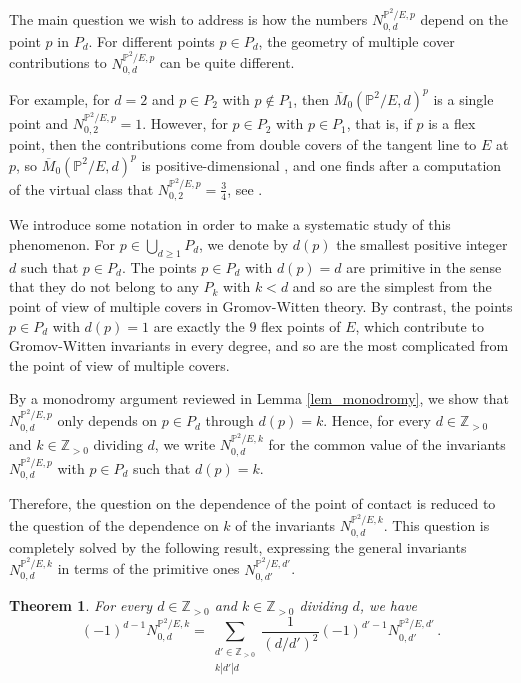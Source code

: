 \documentclass[11pt,letterpaper]{amsart}
\newtheorem{thm}[defn]{Theorem}
\newcommand\PP{\mathbb P}
\newcommand\Z{\mathbb Z}
\begin{document}
The main question we wish to address is how the numbers
$N_{0,d}^{\PP^2/E,p}$ depend on the point $p$ in $P_d$.
For different points $p \in P_d$, the geometry of multiple cover contributions to $N_{0,d}^{\PP^2/E,p}$ can be quite different. 

For example, for $d=2$ and $p \in P_2$ with $p \notin P_1$, then $\overline{M}_{0}(\PP^2/E,d)^p$ is a single point and $N_{0,2}^{\PP^2/E,p}=1$. However, for $p \in P_2$ with $p \in P_1$, that is, if $p$ is a flex point, then
the contributions come from double covers of the tangent line to $E$ at $p$, so 
$\overline{M}_{0}(\PP^2/E,d)^p$ is positive-dimensional , and one finds after a computation of the virtual class that
$N_{0,2}^{\PP^2/E,p}=\frac{3}{4}$,
see \cite[Proposition 6.1]{MR2667135}.

We introduce some notation in order to make a systematic study of this phenomenon.
For $p \in \bigcup_{d \geqslant 1} P_d$, we denote by 
$d(p)$ the smallest positive integer $d$ such that 
$p \in P_d$. 
The points $p \in P_d$ with $d(p)=d$ are 
primitive in the sense that they do not belong to any $P_k$ with $k<d$ and so are the simplest
from the point of view of multiple covers in Gromov-Witten theory. 
By contrast, the points $p \in P_d$ with $d(p)=1$ are exactly the $9$ flex points of $E$, which contribute to Gromov-Witten invariants in every degree, and so are the most complicated from the point of view of multiple covers.


By a monodromy argument reviewed in Lemma
\ref{lem_monodromy}, we show that
$N_{0,d}^{\PP^2/E,p}$ only depends on $p \in P_d$ through $d(p)=k$. Hence, 
for every $d \in \Z_{>0}$ and 
$k \in \Z_{>0}$ dividing $d$, we write
$N_{0,d}^{\PP^2/E,k}$ for the common value  of the invariants $N_{0,d}^{\PP^2/E,p}$ with
$p \in P_d$ such that $d(p)=k$. 

Therefore, the question on the dependence of the point of contact is reduced to the question of the dependence on $k$ of the invariants $N_{0,d}^{\PP^2/E, k}$. 
This question is 
completely solved by the following result, expressing the general invariants 
$N_{0,d}^{\PP^2/E,k}$ in terms of the primitive ones 
$N_{0,d'}^{\PP^2/E,d'}$.

\begin{thm} \label{thm_takahashi_precise}
For every $d \in \Z_{>0}$ and $k
\in \Z_{>0}$ dividing $d$, we have 
\begin{equation}(-1)^{d-1} N_{0,d}^{\PP^2/E,k}=\sum_{\substack{d'\in \Z_{>0} \\ k|d'|d}} \frac{1}{(d/d')^2}(-1)^{d'-1}
N_{0,d'}^{\PP^2/E,d'} \,.\end{equation}
\end{thm}
\end{document}
